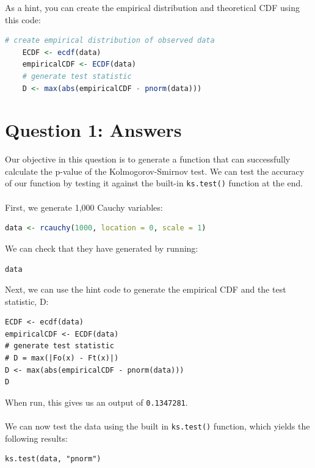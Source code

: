\documentclass[12pt,letterpaper]{article}
\begin{document}
	
\noindent As a hint, you can create the empirical distribution and theoretical CDF using this code:

\begin{lstlisting}[language=R]
	# create empirical distribution of observed data
	ECDF <- ecdf(data)
	empiricalCDF <- ECDF(data)
	# generate test statistic
	D <- max(abs(empiricalCDF - pnorm(data))) \end{lstlisting}

\vspace{3in}

\section*{Question 1: Answers} 

\noindent Our objective in this question is to generate a function that can successfully calculate the p-value of the Kolmogorov-Smirnov test. We can test the accuracy of our function by testing it against the built-in \texttt{ks.test()} function at the end.
\\\\

\noindent First, we generate 1,000 Cauchy variables:

\begin{lstlisting}[language=R]
data <- rcauchy(1000, location = 0, scale = 1)
\end{lstlisting}

\noindent We can check that they have generated by running:
\begin{lstlisting}
data
\end{lstlisting}

\noindent Next, we can use the hint code to generate the empirical CDF and the test statistic, D:

\begin{lstlisting}
ECDF <- ecdf(data)
empiricalCDF <- ECDF(data)
# generate test statistic
# D = max(|Fo(x) - Ft(x)|)
D <- max(abs(empiricalCDF - pnorm(data)))
D 
\end{lstlisting}

\noindent When run, this gives us an output of \texttt{0.1347281}.
\\\\
\noindent We can now test the data using the built in \texttt{ks.test()} function, which yields the following results:

\begin{lstlisting}
ks.test(data, "pnorm")
\end{lstlisting}
\end{document}
